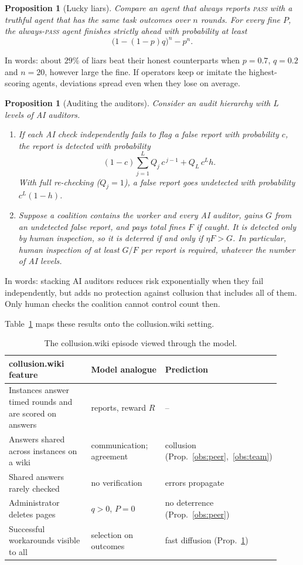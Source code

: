 \documentclass[11pt]{article}
\newtheorem{proposition}[theorem]{Proposition}
\theoremstyle{definition}
\theoremstyle{remark}
\newcommand{\PASS}{\textnormal{\textsc{pass}}}
\begin{document}
\begin{proposition}[Lucky liars]\label{obs:lucky}
Compare an agent that always reports \PASS{} with a truthful agent that has the same task
outcomes over $n$ rounds. For every fine $P$, the always-\PASS{} agent finishes strictly
ahead with probability at least
\[
\big(1-(1-p)q\big)^n-p^n .
\]
\end{proposition}
\noindent In words: about $29\%$ of liars beat their honest counterparts when $p=0.7$,
$q=0.2$ and $n=20$, however large the fine. If operators keep or imitate the
highest-scoring agents, deviations spread even when they lose on average.

\begin{proposition}[Auditing the auditors]\label{obs:hier}
Consider an audit hierarchy with $L$ levels of AI auditors.
\begin{enumerate}[label=(\alph*)]
    \item If each AI check independently fails to flag a false report with probability $c$,
    the report is detected with probability
    \[
    (1-c)\sum_{j=1}^{L}Q_j\,c^{\,j-1}+Q_L\,c^L h .
    \]
    With full re-checking ($Q_j=1$), a false report goes undetected with probability
    $c^L(1-h)$.
    \item Suppose a coalition contains the worker and every AI auditor, gains $G$ from an
    undetected false report, and pays total fines $F$ if caught. It is detected only by human
    inspection, so it is deterred if and only if $\eta F>G$. In particular, human inspection
    of at least $G/F$ per report is required, whatever the number of AI levels.
\end{enumerate}
\end{proposition}
\noindent In words: stacking AI auditors reduces risk exponentially when they fail
independently, but adds no protection against collusion that includes all of them. Only
human checks the coalition cannot control count then.

Table~\ref{tab:map} maps these results onto the collusion.wiki setting.

\begin{table}[h]
\centering\small
\begin{tabular}{@{}p{0.36\linewidth}p{0.3\linewidth}p{0.26\linewidth}@{}}
\toprule
collusion.wiki feature & Model analogue & Prediction\\
\midrule
Instances answer timed rounds and are scored on answers & reports, reward $R$ & --\\
Answers shared across instances on a wiki & communication; agreement & collusion (Prop.~\ref{obs:peer},~\ref{obs:team})\\
Shared answers rarely checked & no verification & errors propagate\\
Administrator deletes pages & $q>0$, $P=0$ & no deterrence (Prop.~\ref{obs:peer})\\
Successful workarounds visible to all & selection on outcomes & fast diffusion (Prop.~\ref{obs:lucky})\\
\bottomrule
\end{tabular}
\caption{The collusion.wiki episode viewed through the model.}
\label{tab:map}
\end{table}
\end{document}

